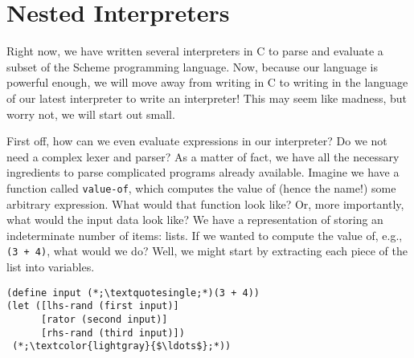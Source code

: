 \section{Nested Interpreters}

Right now, we have written several interpreters in C to parse and evaluate a subset of the Scheme programming language. Now, because our language is powerful enough, we will move away from writing in C to writing in the language of our latest interpreter to write an interpreter! This may seem like madness, but worry not, we will start out small.

First off, how can we even evaluate expressions in our interpreter? Do we not need a complex lexer and parser? As a matter of fact, we have all the necessary ingredients to parse complicated programs already available. Imagine we have a function called \texttt{value-of}, which computes the value of (hence the name!) some arbitrary expression. What would that function look like? Or, more importantly, what would the input data look like? We have a representation of storing an indeterminate number of items: lists. If we wanted to compute the value of, e.g., \texttt{\textquotesingle{}(3 + 4)}, what would we do? Well, we might start by extracting each piece of the list into variables.

\begin{cl}[]{}\begin{lstlisting}[language=MyScheme]
(define input (*;\textquotesingle;*)(3 + 4))
(let ([lhs-rand (first input)]
      [rator (second input)]
      [rhs-rand (third input)])
 (*;\textcolor{lightgray}{$\ldots$};*))
\end{lstlisting}\end{cl}

